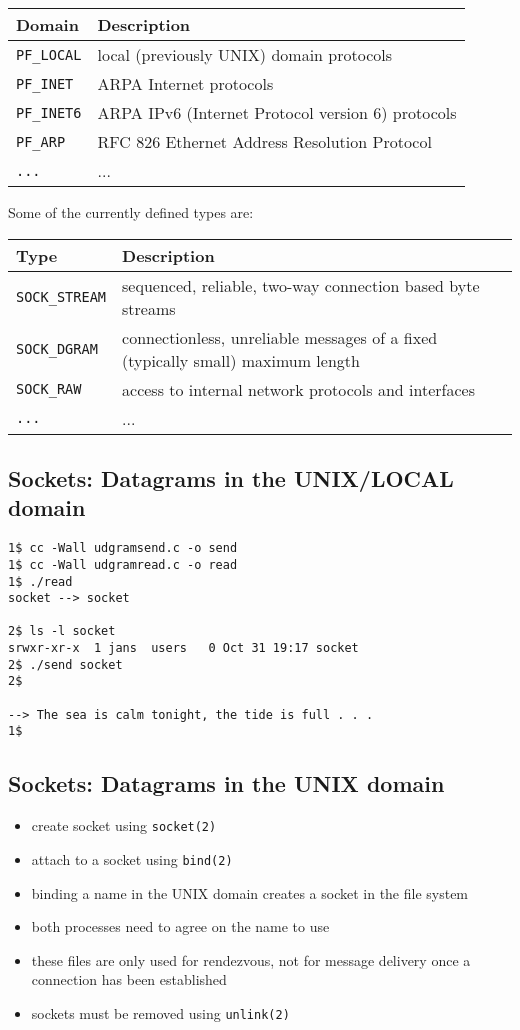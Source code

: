 \documentclass[xga]{xdvislides}
\begin{document}
\small
\begin{tabular}{| l | l |}
	\hline
	{\bf Domain} & {\bf Description} \\
	\hline
	{\tt PF\_LOCAL} 	& 	local (previously UNIX) domain protocols \\
	{\tt PF\_INET}		&	ARPA Internet protocols \\
	{\tt PF\_INET6}		&	ARPA IPv6 (Internet Protocol version 6) protocols \\
	{\tt PF\_ARP}		&	RFC 826 Ethernet Address Resolution Protocol\\
	{\tt ...}		&	...\\
	\hline
\end{tabular}
\Normalsize
\vspace{.5in}

Some of the currently defined types are:
\\

\small
\begin{tabular}{| l | l |}
	\hline
	{\bf Type}		&	{\bf Description} \\
	\hline
	{\tt SOCK\_STREAM}	&	sequenced, reliable, two-way connection based byte streams \\
	{\tt SOCK\_DGRAM}	&	connectionless, unreliable messages of a fixed (typically small)
							maximum length \\
	{\tt SOCK\_RAW}		&	access to internal network protocols and interfaces \\
	{\tt ...}		&	... \\
	\hline
\end{tabular}
\Normalsize

\subsection{Sockets: Datagrams in the UNIX/LOCAL domain}
\begin{verbatim}
1$ cc -Wall udgramsend.c -o send
1$ cc -Wall udgramread.c -o read
1$ ./read
socket --> socket

2$ ls -l socket
srwxr-xr-x  1 jans  users   0 Oct 31 19:17 socket
2$ ./send socket
2$

--> The sea is calm tonight, the tide is full . . .
1$
\end{verbatim}
\vfill


\subsection{Sockets: Datagrams in the UNIX domain}
\begin{itemize}
	\item create socket using {\tt socket(2)}
	\item attach to a socket using {\tt bind(2)}
	\item binding a name in the UNIX domain creates a socket in the file system
	\item both processes need to agree on the name to use
	\item these files are only used for rendezvous, not for message delivery
		once a connection has been established
	\item sockets must be removed using {\tt unlink(2)}
\end{itemize}
\end{document}
